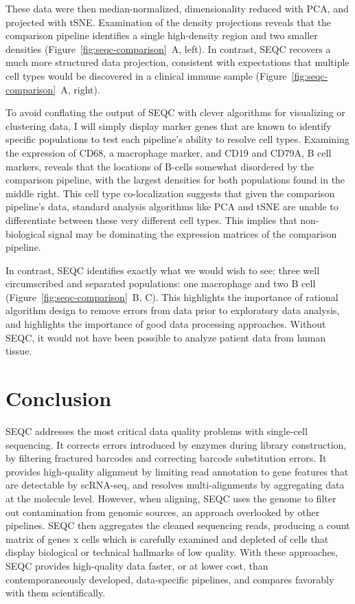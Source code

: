 These data were then median-normalized, dimensionality reduced with PCA, and projected with tSNE\@. 
Examination of the density projections reveals that the comparison pipeline identifies a single high-density region and two smaller densities (Figure~\ref{fig:seqc-comparison}~A, left).
In contrast, SEQC recovers a much more structured data projection, consistent with expectations that multiple cell types would be discovered in a clinical immune sample (Figure~\ref{fig:seqc-comparison}~A, right). 

To avoid conflating the output of SEQC with clever algorithms for visualizing or clustering data, I will simply display marker genes that are known to identify specific populations to test each pipeline's ability to resolve cell types. 
Examining the expression of CD68, a macrophage marker, and CD19 and CD79A, B cell markers, reveals that the locations of B-cells somewhat disordered by the comparison pipeline, with the largest densities for both populations found in the middle right. 
This cell type co-localization suggests that given the comparison pipeline's data, standard analysis algorithms like PCA and tSNE are unable to differentiate between these very different cell types. 
This implies that non-biological signal may be dominating the expression matrices of the comparison pipeline. 

In contrast, SEQC identifies exactly what we would wish to see: three well circumscribed and separated populations: one macrophage and two B cell (Figure~\ref{fig:seqc-comparison}~B, C). 
This highlights the importance of rational algorithm design to remove errors from data prior to exploratory data analysis, and highlights the importance of good data processing approaches. Without SEQC, it would not have been possible to analyze patient data from human tissue. 

\section{Conclusion}

SEQC addresses the most critical data quality problems with single-cell sequencing. 
It corrects errors introduced by enzymes during library construction, by filtering fractured barcodes and correcting barcode substitution errors. 
It provides high-quality alignment by limiting read annotation to gene features that are detectable by scRNA-seq, and resolves multi-alignments by aggregating data at the molecule level.  
However, when aligning, SEQC uses the genome to filter out contamination from genomic sources, an approach overlooked by other pipelines. 
SEQC then aggregates the cleaned sequencing reads, producing a count matrix of genes x cells which is carefully examined and depleted of cells that display biological or technical hallmarks of low quality. 
With these approaches, SEQC provides high-quality data faster, or at lower cost, than contemporaneously developed, data-specific pipelines, and compares favorably with them scientifically. 

